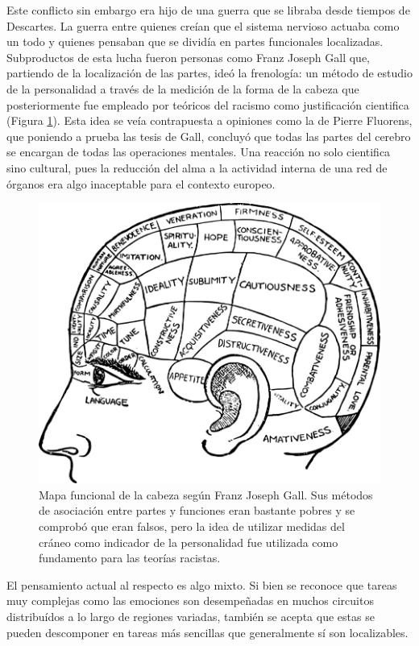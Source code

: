 Este conflicto sin embargo era hijo de una guerra que se libraba desde tiempos de Descartes. La guerra entre quienes creían que el sistema nervioso actuaba como un todo y quienes pensaban que se dividía en partes funcionales localizadas. Subproductos de esta lucha fueron personas como Franz Joseph Gall que, partiendo de la localización de las partes, ideó la frenología: un método de estudio de la personalidad a través de la medición de la forma de la cabeza que posteriormente fue empleado por teóricos del racismo como justificación cientifica (Figura \ref{gall}). Esta idea se veía contrapuesta a opiniones como la de Pierre Fluorens, que poniendo a prueba las tesis de Gall, concluyó que todas las partes del cerebro se encargan de todas las operaciones mentales. Una reacción no solo cientifica sino cultural, pues la reducción del alma a la actividad interna de una red de órganos era algo inaceptable para el contexto europeo.

\begin{figure}[H]
	\centering

	\includegraphics[width=\linewidth]{media/4-gall.png}
	\caption{Mapa funcional de la cabeza según Franz Joseph Gall. Sus métodos de asociación entre partes y funciones eran bastante pobres y se comprobó que eran falsos, pero la idea de utilizar medidas del cráneo como indicador de la personalidad fue utilizada como fundamento para las teorías racistas.}
	\label{gall}
\end{figure}

El pensamiento actual al respecto es algo mixto. Si bien se reconoce que tareas muy complejas como las emociones son desempeñadas en muchos circuitos distribuídos a lo largo de regiones variadas, también se acepta que estas se pueden descomponer en tareas más sencillas que generalmente sí son localizables.

